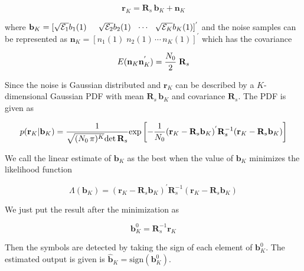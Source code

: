 \begin{equation}
\mathrm{\mathbf{r}}_K = \mathrm{\mathbf{R}}_s\,\mathrm{\mathbf{b}}_K + \mathrm{\mathbf{n}}_K
\end{equation}

where $\mathrm{\mathbf{b}}_K=[\sqrt{\mathcal{E}_1}b_1(1)\hspace{5mm}\sqrt{\mathcal{E}_2}b_2(1)\hspace{2.5mm}\cdots\hspace{2.5mm}\sqrt{\mathcal{E}_K}b_K(1)]^{'}$ and the noise samples can be represented as $\mathrm{\mathbf{n}}_K=[n_1(1)\;n_2(1)\,\cdots\,n_K(1)]^{'}$ which has the covariance 

\begin{equation}
E(\mathrm{\mathbf{n}}_K\mathrm{\mathbf{n}}_K^{'})=\frac{\hbox{$N_0$}}{\hbox{$2$}}\;\mathrm{\mathbf{R}}_s
\end{equation}

Since the noise is Gaussian distributed and $\mathrm{\mathbf{r}}_K$ can be described by a $K$-dimensional Gaussian PDF with mean $\mathrm{\mathbf{R}}_s\,\mathrm{\mathbf{b}}_K$ and covariance $\mathrm{\mathbf{R}}_s$. The PDF is given as

\begin{equation}
p(\mathrm{\mathbf{r}}_K\vert \mathrm{\mathbf{b}}_K) = \frac{\hbox{$1$}}{\hbox{$\sqrt{(N_0\,\pi)^K}\mathrm{det}\,\mathrm{\mathbf{R}}_s$}}\mathrm{exp}
\left[
-\frac{\hbox{$1$}}{\hbox{$N_0$}}
(\mathrm{\mathbf{r}}_K-\mathrm{\mathbf{R}}_s\mathrm{\mathbf{b}}_K)^{'}
\mathrm{\mathbf{R}}_s^{-1}
(\mathrm{\mathbf{r}}_K-\mathrm{\mathbf{R}}_s\mathrm{\mathbf{b}}_K)
\right]
\end{equation}

We call the linear estimate of $\mathrm{\mathbf{b}}_K$ as the best when the value of $\mathrm{\mathbf{b}}_K$ minimizes the likelihood function

\begin{equation}
\Lambda(\mathrm{\mathbf{b}}_K)=(\mathrm{\mathbf{r}}_K-\mathrm{\mathbf{R}}_s\mathrm{\mathbf{b}}_K)^{'}\mathrm{\mathbf{R}}_s^{-1}
(\mathrm{\mathbf{r}}_K-\mathrm{\mathbf{R}}_s\mathrm{\mathbf{b}}_K)
\end{equation}

We just put the result after the minimization as

\begin{equation}
\mathrm{\mathbf{b}}_K^{0}=\mathrm{\mathbf{R}}_s^{-1}\mathrm{\mathbf{r}}_K
\end{equation}

Then the symbols are detected by taking the sign of each element of $\mathrm{\mathbf{b}}_K^{0}$. The estimated output is given is $\mathrm{\mathbf{\hat{b}}}_K=\mathrm{sign}(\mathrm{\mathbf{b}}_K^{0})$.\\

